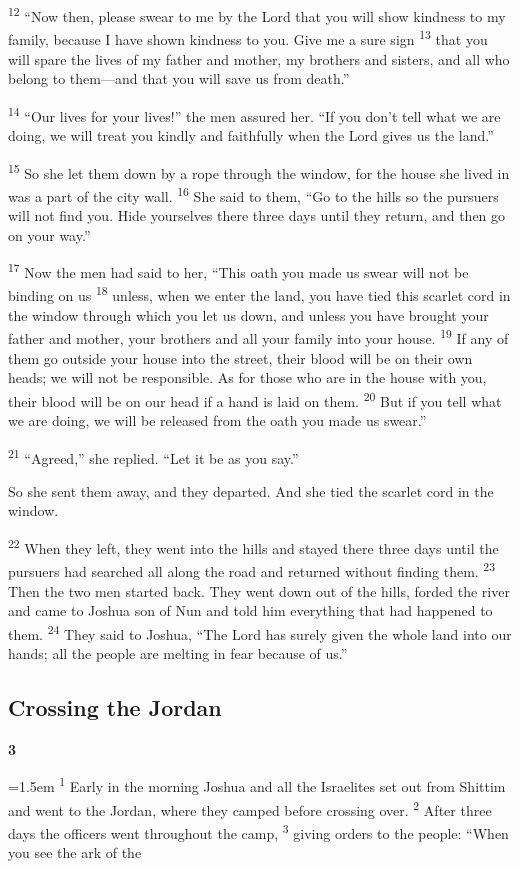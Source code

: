 \documentclass[12pt,twoside]{article}
\newcommand{\vs}[1]{\textsuperscript{#1}}
\newcommand{\chapterWithIndent}[2]{%
  \noindent
  \begin{minipage}[t]{1cm}
    \vspace{-0.4\baselineskip}
    {\fontsize{40pt}{48pt}\selectfont \textbf{#1}}
  \end{minipage}%
  \hspace{0.3cm}%
  \begin{minipage}[t]{\dimexpr\linewidth - 1.5cm - 0.3cm\relax}
    \hangindent=1.5em
    \hangafter=3
    #2
    \vspace{0.1cm}
  \end{minipage}
}
\begin{document}
\vs{12} ``Now then, please swear to me by the Lord that you will show kindness to my family, because I have shown kindness to you. Give me a sure sign
\vs{13} that you will spare the lives of my father and mother, my brothers and sisters, and all who belong to them---and that you will save us from death.''

\vs{14} ``Our lives for your lives!'' the men assured her. ``If you don't tell what we are doing, we will treat you kindly and faithfully when the Lord gives us the land.''

\vs{15} So she let them down by a rope through the window, for the house she lived in was a part of the city wall.
\vs{16} She said to them, ``Go to the hills so the pursuers will not find you. Hide yourselves there three days until they return, and then go on your way.''

\vs{17} Now the men had said to her, ``This oath you made us swear will not be binding on us
\vs{18} unless, when we enter the land, you have tied this scarlet cord in the window through which you let us down, and unless you have brought your father and mother, your brothers and all your family into your house.
\vs{19} If any of them go outside your house into the street, their blood will be on their own heads; we will not be responsible. As for those who are in the house with you, their blood will be on our head if a hand is laid on them.
\vs{20} But if you tell what we are doing, we will be released from the oath you made us swear.''

\vs{21} ``Agreed,'' she replied. ``Let it be as you say.''

So she sent them away, and they departed. And she tied the scarlet cord in the window.

\vs{22} When they left, they went into the hills and stayed there three days until the pursuers had searched all along the road and returned without finding them.
\vs{23} Then the two men started back. They went down out of the hills, forded the river and came to Joshua son of Nun and told him everything that had happened to them.
\vs{24} They said to Joshua, ``The Lord has surely given the whole land into our hands; all the people are melting in fear because of us.''

\subsection*{\textbf{Crossing the Jordan}}

\chapterWithIndent{3}{%
  \vs{1} Early in the morning Joshua and all the Israelites set out from Shittim and went to the Jordan, where they camped before crossing over.
  \vs{2} After three days the officers went throughout the camp,
  \vs{3} giving orders to the people: “When you see the ark of the 
}
\end{document}
